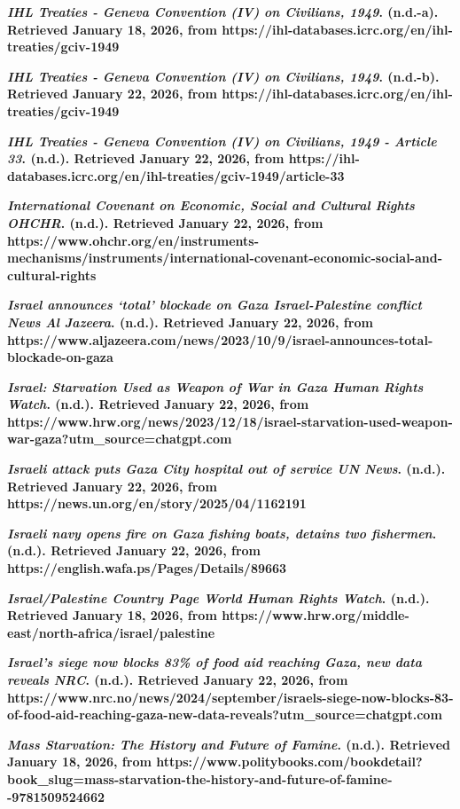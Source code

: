 \textbf{\emph{IHL Treaties - Geneva Convention (IV) on Civilians, 1949}.
(n.d.-a). Retrieved January 18, 2026, from
https://ihl-databases.icrc.org/en/ihl-treaties/gciv-1949}

\textbf{\emph{IHL Treaties - Geneva Convention (IV) on Civilians, 1949}.
(n.d.-b). Retrieved January 22, 2026, from
https://ihl-databases.icrc.org/en/ihl-treaties/gciv-1949}

\textbf{\emph{IHL Treaties - Geneva Convention (IV) on Civilians, 1949 -
Article 33}. (n.d.). Retrieved January 22, 2026, from
https://ihl-databases.icrc.org/en/ihl-treaties/gciv-1949/article-33}

\textbf{\emph{International Covenant on Economic, Social and Cultural
Rights \textbar{} OHCHR}. (n.d.). Retrieved January 22, 2026, from
https://www.ohchr.org/en/instruments-mechanisms/instruments/international-covenant-economic-social-and-cultural-rights}

\textbf{\emph{Israel announces `total' blockade on Gaza \textbar{}
Israel-Palestine conflict News \textbar{} Al Jazeera}. (n.d.). Retrieved
January 22, 2026, from
https://www.aljazeera.com/news/2023/10/9/israel-announces-total-blockade-on-gaza}

\textbf{\emph{Israel: Starvation Used as Weapon of War in Gaza
\textbar{} Human Rights Watch}. (n.d.). Retrieved January 22, 2026, from
https://www.hrw.org/news/2023/12/18/israel-starvation-used-weapon-war-gaza?utm\_source=chatgpt.com}

\textbf{\emph{Israeli attack puts Gaza City hospital out of service
\textbar{} UN News}. (n.d.). Retrieved January 22, 2026, from
https://news.un.org/en/story/2025/04/1162191}

\textbf{\emph{Israeli navy opens fire on Gaza fishing boats, detains two
fishermen}. (n.d.). Retrieved January 22, 2026, from
https://english.wafa.ps/Pages/Details/89663}

\textbf{\emph{Israel/Palestine \textbar{} Country Page \textbar{} World
\textbar{} Human Rights Watch}. (n.d.). Retrieved January 18, 2026, from
https://www.hrw.org/middle-east/north-africa/israel/palestine}

\textbf{\emph{Israel's siege now blocks 83\% of food aid reaching Gaza,
new data reveals \textbar{} NRC}. (n.d.). Retrieved January 22, 2026,
from
https://www.nrc.no/news/2024/september/israels-siege-now-blocks-83-of-food-aid-reaching-gaza-new-data-reveals?utm\_source=chatgpt.com}

\textbf{\emph{Mass Starvation: The History and Future of Famine}.
(n.d.). Retrieved January 18, 2026, from
https://www.politybooks.com/bookdetail?book\_slug=mass-starvation-the-history-and-future-of-famine-\/-9781509524662}

